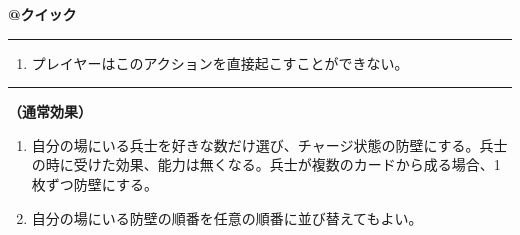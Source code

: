 \documentclass[twocolumn,a5paper,papersize,10pt]{jarticle}
\begin{document}
\begin{tcolorbox}[title={\small\bf【Action】幻影}{\scriptsize （誘発）}]

{\scriptsize\bf @クイック }

\vspace{1mm} %
\hrule height 0.1mm depth 0mm width 62mm %
\vspace{1mm} %


\vspace{-1zh}%
\begin{enumerate}
\renewcommand{\labelenumi}{※}
\setlength{\leftskip}{-0.3cm}
\setlength{\itemsep}{0pt} %
\setlength{\parskip}{0pt} %

\item プレイヤーはこのアクションを直接起こすことができない。

\vspace{-3mm}%
\end{enumerate}
\vspace{-2mm} %
\vspace{1zh}%
\vspace{1mm} %
\hrule height 0.1mm depth 0mm width 62mm %
\vspace{1mm} %

{\bf（通常効果）}


\vspace{-1zh}%
\begin{enumerate}
\setlength{\leftskip}{-0.3cm}
\setlength{\parskip}{0pt} %

\item 自分の場にいる兵士を好きな数だけ選び、チャージ状態の防壁にする。兵士の時に受けた効果、能力は無くなる。兵士が複数のカードから成る場合、1枚ずつ防壁にする。

\item 自分の場にいる防壁の順番を任意の順番に並び替えてもよい。
\vspace{-1zh}%
\end{enumerate}

\vspace{1mm} %
\end{tcolorbox}

\vspace{-1zh}

 
 
 
\end{document}
